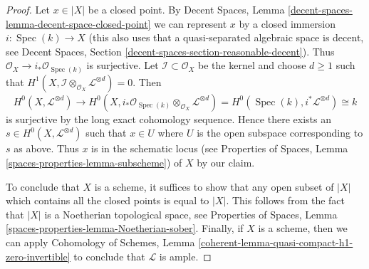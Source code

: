 \documentclass[10pt,a4paper]{amsart}
\theoremstyle{plain}
\theoremstyle{definition}
\theoremstyle{remark}
\numberwithin{equation}{subsection}
\def\Spec{\mathop{\mathrm{Spec}}}
\begin{document}
\begin{proof}
\medskip\noindent
Let $x \in |X|$ be a closed point. By Decent Spaces, Lemma
\ref{decent-spaces-lemma-decent-space-closed-point}
we can represent $x$ by a closed immersion $i : \Spec(k) \to X$
(this also uses that a quasi-separated algebraic space is
decent, see Decent Spaces, Section
\ref{decent-spaces-section-reasonable-decent}).
Thus $\mathcal{O}_X \to i_*\mathcal{O}_{\Spec(k)}$ is surjective.
Let $\mathcal{I} \subset \mathcal{O}_X$ be the kernel and choose
$d \geq 1$ such that
$H^1(X, \mathcal{I} \otimes_{\mathcal{O}_X} \mathcal{L}^{\otimes d}) = 0$.
Then
$$
H^0(X, \mathcal{L}^{\otimes d}) \to
H^0(X,
i_*\mathcal{O}_{\Spec(k)} \otimes_{\mathcal{O}_X} \mathcal{L}^{\otimes d}) =
H^0(\Spec(k), i^*\mathcal{L}^{\otimes d}) \cong k
$$
is surjective by the long exact cohomology sequence. Hence
there exists an $s \in H^0(X, \mathcal{L}^{\otimes d})$
such that $x \in U$ where $U$ is the open subspace corresponding to $s$
as above. Thus $x$ is in the schematic locus
(see Properties of Spaces, Lemma \ref{spaces-properties-lemma-subscheme})
of $X$ by our claim.

\medskip\noindent
To conclude that $X$ is a scheme, it suffices to show that
any open subset of $|X|$ which contains all the closed points
is equal to $|X|$. This follows from the fact that $|X|$
is a Noetherian topological space, see
Properties of Spaces, Lemma \ref{spaces-properties-lemma-Noetherian-sober}.
Finally, if $X$ is a scheme, then we can apply
Cohomology of Schemes, Lemma
\ref{coherent-lemma-quasi-compact-h1-zero-invertible}
to conclude that $\mathcal{L}$ is ample.
\end{proof}
\end{document}
